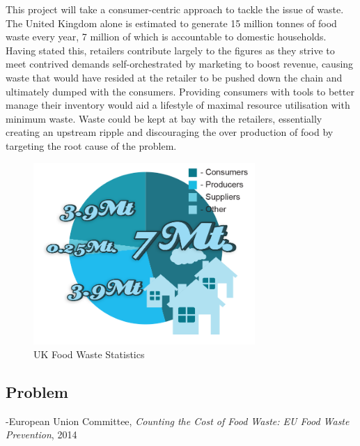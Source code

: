 \documentclass[a4paper, 11pt]{article}
\begin{document}
This project will take a consumer-centric approach to tackle the issue of waste. The United Kingdom alone is estimated to generate 15 million tonnes of food waste every year, 7 million of which is accountable to domestic households.\cite{statistic} Having stated this, retailers contribute largely to the figures as they strive to meet contrived demands self-orchestrated by marketing to boost revenue, causing waste that would have resided at the retailer to be pushed down the chain and ultimately dumped with the consumers.\cite{waste} Providing consumers with tools to better manage their inventory would aid a lifestyle of maximal resource utilisation with minimum waste. Waste could be kept at bay with the retailers, essentially creating an upstream ripple and discouraging the over production of food by targeting the root cause of the problem.
  \vspace{\baselineskip}

\begin{figure}[h!]
  \centering
    \includegraphics[width=0.75\textwidth]{system7.png}
      \caption{UK Food Waste Statistics}
\end{figure}

\vspace{\baselineskip}

\subsection{Problem}


\begin{quoting}
-European Union Committee, \emph{Counting the Cost of Food Waste: EU Food Waste Prevention}, 2014\cite{FoodWaste}
\end{quoting}
\end{document}
